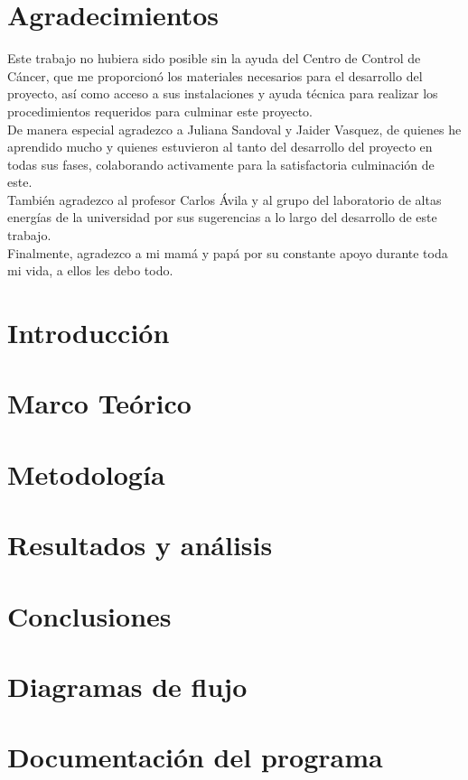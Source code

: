 \documentclass[12pt]{report}
\theoremstyle{definition}
\begin{document}
\newpage

\chapter*{Agradecimientos}
Este trabajo no hubiera sido posible sin la ayuda del Centro de Control de Cáncer, que me proporcionó los materiales necesarios para el desarrollo del proyecto, así como acceso a sus instalaciones y ayuda técnica para realizar los procedimientos requeridos para culminar este proyecto.\\

De manera especial agradezco a Juliana Sandoval y Jaider Vasquez, de quienes he aprendido mucho y quienes estuvieron al tanto del desarrollo del proyecto en todas sus fases, colaborando activamente para la satisfactoria culminación de este.\\

También agradezco al profesor Carlos \'Avila y al grupo del laboratorio de altas energías de la universidad por sus sugerencias a lo largo del desarrollo de este trabajo.\\

Finalmente, agradezco a mi mamá y papá por su constante apoyo durante toda mi vida, a ellos les debo todo.  

\tableofcontents

\listoffigures

\chapter{Introducción}



\chapter{Marco Teórico}\label{chp:teorico}


\chapter{Metodología}\label{chp:metodologia}


\chapter{Resultados y análisis}\label{chp:resultados}



\chapter{Conclusiones}\label{chp:conclusiones}


\begin{appendices}
	\chapter{Diagramas de flujo}\label{app:apendiceA}
	
	\chapter{Documentación del programa}\label{app:apendiceB}
	
\end{appendices}



\end{document}
